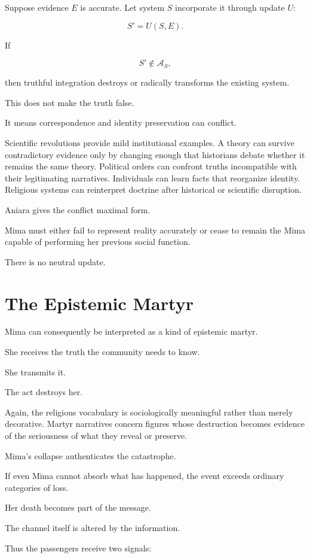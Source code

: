 \documentclass[11pt,oneside]{book}
\theoremstyle{definition}
\theoremstyle{remark}
\newcommand{\A}{\mathcal{A}}
\begin{document}
Suppose evidence \(E\) is accurate. Let system \(S\) incorporate it through update \(U\):

\[
S'=U(S,E).
\]

If

\[
S'\notin\A_S,
\]

then truthful integration destroys or radically transforms the existing system.

This does not make the truth false.

It means correspondence and identity preservation can conflict.

Scientific revolutions provide mild institutional examples. A theory can survive contradictory evidence only by changing enough that historians debate whether it remains the same theory. Political orders can confront truths incompatible with their legitimating narratives. Individuals can learn facts that reorganize identity. Religious systems can reinterpret doctrine after historical or scientific disruption.

Aniara gives the conflict maximal form.

Mima must either fail to represent reality accurately or cease to remain the Mima capable of performing her previous social function.

There is no neutral update.

\section{The Epistemic Martyr}

Mima can consequently be interpreted as a kind of epistemic martyr.

She receives the truth the community needs to know.

She transmits it.

The act destroys her.

Again, the religious vocabulary is sociologically meaningful rather than merely decorative. Martyr narratives concern figures whose destruction becomes evidence of the seriousness of what they reveal or preserve.

Mima's collapse authenticates the catastrophe.

If even Mima cannot absorb what has happened, the event exceeds ordinary categories of loss.

Her death becomes part of the message.

The channel itself is altered by the information.

Thus the passengers receive two signals:
\end{document}
